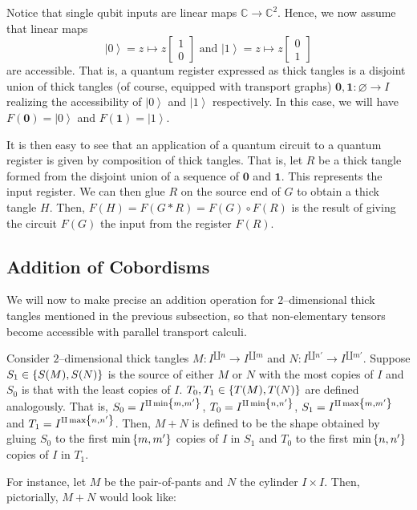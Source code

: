 \documentclass{amsart}
\newcommand{\C}{\mathbb{C}}
\renewcommand{\to}[1][]{\stackrel{#1}{\longrightarrow}}
\renewcommand{\mapsto}{\longmapsto}
\newcommand{\curly}[1]{\left\{ #1 \right\}}
\newcommand{\set}[2][]{\ifthenelse{\equal{#1}{}}
                                  {\curly{#2}}
                                  {\curly{#1\ \textbf{:}\ #2}}}
\newcommand{\bmat}[1]{\begin{bmatrix} #1 \end{bmatrix}}
\newcommand{\ket}[1]{\left| #1 \right\rangle}
\numberwithin{thm}{section}
\theoremstyle{definition}
\begin{document}
Notice that single qubit inputs are linear maps $\C \to \C^2$. Hence, we now
assume that linear maps
\[
  \ket{0} = z \mapsto z\bmat{1 \\ 0} \text{ and }
  \ket{1} = z \mapsto z \bmat{0 \\ 1}
\]
are accessible. That is, a quantum register expressed as thick tangles is a
disjoint union of thick tangles (of course, equipped with transport graphs)
$\mathbf{0}, \mathbf{1} : \varnothing \to I$ realizing the accessibility of
$\ket{0}$ and $\ket{1}$ respectively. In this case, we will have
$F(\mathbf{0}) = \ket{0}$ and $F(\mathbf{1}) = \ket{1}$.

It is then easy to see that an application of a quantum circuit to a quantum
register is given by composition of thick tangles. That is, let $R$ be a thick
tangle formed from the disjoint union of a sequence of $\mathbf{0}$ and
$\mathbf{1}$. This represents the input register. We can then glue $R$ on the
source end of $G$ to obtain a thick tangle $H$. Then,
$F(H) = F(G * R) = F(G) \circ F(R)$ is the result of giving the circuit
$F(G)$ the input from the register $F(R)$.

%

\subsection{Addition of Cobordisms}

We will now to make precise an addition operation for $2$--dimensional thick tangles
mentioned in the previous subsection, so that non-elementary tensors become
accessible with parallel transport calculi.

Consider $2$--dimensional thick tangles $M : I^{\amalg n} \to I^{\amalg m}$ and
$N : I^{\amalg n'} \to I^{\amalg m'}$. Suppose $S_1 \in \set{S(M), S(N)}$ is the
source of either $M$ or $N$ with the most copies of $I$ and $S_0$ is that with
the least copies of $I$. $T_0, T_1 \in \set{T(M), T(N)}$ are defined
analogously. That is, $S_0 = I^{\amalg \min\set{m, m'}}$,
$T_0 = I^{\amalg \min\set{n, n'}}$, $S_1 = I^{\amalg \max\set{m, m'}}$ and
$T_1 = I^{\amalg \max\set{n, n'}}$. Then, $M + N$ is defined to be the shape
obtained by gluing $S_0$ to the first $\min\set{m, m'}$ copies of $I$ in
$S_1$ and $T_0$ to the first $\min\set{n, n'}$ copies of $I$ in $T_1$.

For instance, let $M$ be the pair-of-pants and $N$ the cylinder $I \times I$.
Then, pictorially, $M + N$ would look like:
\end{document}
